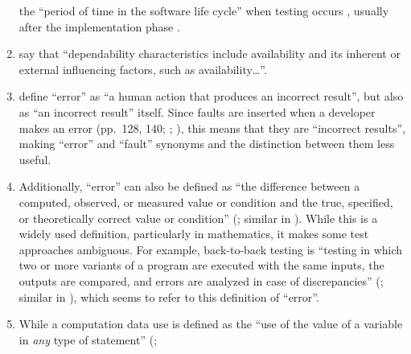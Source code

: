 \begin{enumerate}
          the ``period of time in the software life cycle'' when testing occurs
          \citeyearpar[p.~470]{IEEE2017}, usually after the implementation phase
          \citep[pp.~420, 509;][p.~56]{Perry2006}.
    \item %
          \citet[p.~375]{IEEE2017} say that ``dependability characteristics
          include availability and its inherent or external influencing
          factors, such as availability\dots''.
    \item %
          \citet[p.~128]{IEEE2010} define
          ``error'' as ``a human action that produces an incorrect result'',
          but also as ``an incorrect result'' itself. Since faults are inserted
          when a developer makes an error %
          (pp.~128, 140; \citealp[p.~12\=/3]{SWEBOK2024};
          \citealp[pp.~399\==400]{vanVliet2000}), this means that they are
          ``incorrect results'', making ``error'' and ``fault'' synonyms%
           and
          the distinction between them less useful.
    \item %
          Additionally, ``error'' can also be defined as ``the
          difference between a computed, observed, or measured value or
          condition and the true, specified, or theoretically correct value
          or condition'' (\citealp[p.~128]{IEEE2010}; similar in
          \citealp[pp.~17\=/18 to 17\=/19, 18\=/7 to 18\=/8]{SWEBOK2024}).
          While this is a widely used definition, particularly in mathematics,
          it makes some test approaches ambiguous.
          For example, back-to-back
          testing is ``testing in which two or more variants of a program are
          executed with the same inputs, the outputs are compared, and errors
          are analyzed in case of discrepancies'' (\citealp[p.~30]{IEEE2010};
          similar in \citealpISTQB{}), which seems to refer to this definition
          of ``error''.
    \item %
          While a computation data use is defined as the ``use of the value of a
          variable in \emph{any} type of statement'' (\citealp[p.~2]{IEEE2021c};

\end{enumerate}
